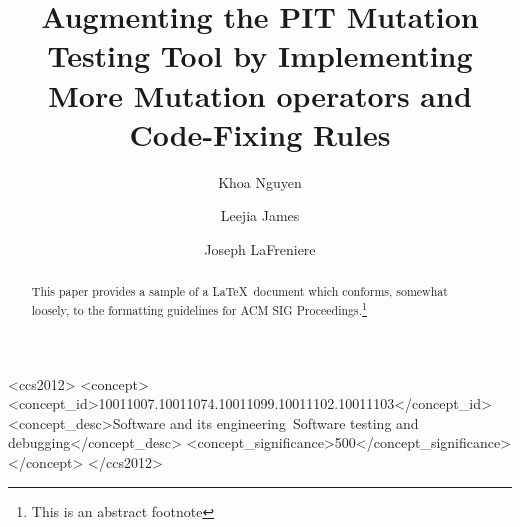 \documentclass[sigconf]{acmart}
\begin{document}
\title{Augmenting the PIT Mutation Testing Tool by Implementing More Mutation operators and Code-Fixing Rules}


\author{Khoa Nguyen}

\author{Leejia James}

\author{Joseph LaFreniere}

\begin{abstract}
This paper provides a sample of a \LaTeX\ document which conforms,
somewhat loosely, to the formatting guidelines for
ACM SIG Proceedings.\footnote{This is an abstract footnote}
\end{abstract}

%
%
\begin{CCSXML}
  <ccs2012>
  <concept>
  <concept_id>10011007.10011074.10011099.10011102.10011103</concept_id>
  <concept_desc>Software and its engineering~Software testing and debugging</concept_desc>
  <concept_significance>500</concept_significance>
  </concept>
  </ccs2012>
\end{CCSXML}




\maketitle






\end{document}
